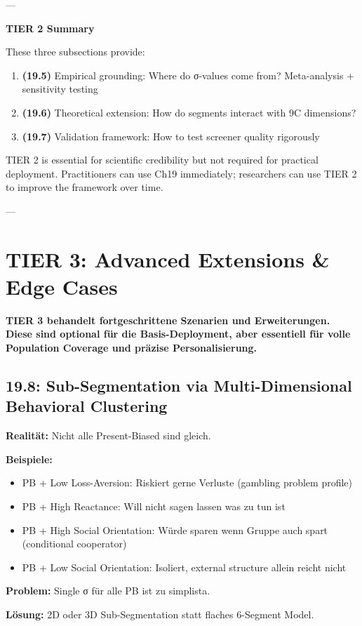 ---

\textbf{TIER 2 Summary}

These three subsections provide:
\begin{enumerate}[nosep]
\item \textbf{(19.5)} Empirical grounding: Where do σ-values come from? Meta-analysis + sensitivity testing
\item \textbf{(19.6)} Theoretical extension: How do segments interact with 9C dimensions?
\item \textbf{(19.7)} Validation framework: How to test screener quality rigorously
\end{enumerate}

TIER 2 is essential for scientific credibility but not required for practical deployment. Practitioners can use Ch19 immediately; researchers can use TIER 2 to improve the framework over time.

---

\section{TIER 3: Advanced Extensions \& Edge Cases}
\label{sec:19-tier3}

\textbf{TIER 3 behandelt fortgeschrittene Szenarien und Erweiterungen. Diese sind optional für die Basis-Deployment, aber essentiell für volle Population Coverage und präzise Personalisierung.}

\subsection{19.8: Sub-Segmentation via Multi-Dimensional Behavioral Clustering}
\label{subsec:19-subsegmentation}

\begin{tcolorbox}[colback=blue!5!white, colframe=blue!75!black, title=\textbf{Problem: 6 Segmente sind zu grob}]

\textbf{Realität:} Nicht alle Present-Biased sind gleich.

\textbf{Beispiele:}
\begin{itemize}[nosep]
\item PB + Low Loss-Aversion: Riskiert gerne Verluste (gambling problem profile)
\item PB + High Reactance: Will nicht sagen lassen was zu tun ist
\item PB + High Social Orientation: Würde sparen wenn Gruppe auch spart (conditional cooperator)
\item PB + Low Social Orientation: Isoliert, external structure allein reicht nicht
\end{itemize}

\textbf{Problem:} Single σ für alle PB ist zu simplista.

\textbf{Lösung:} 2D oder 3D Sub-Segmentation statt flaches 6-Segment Model.

\end{tcolorbox}

